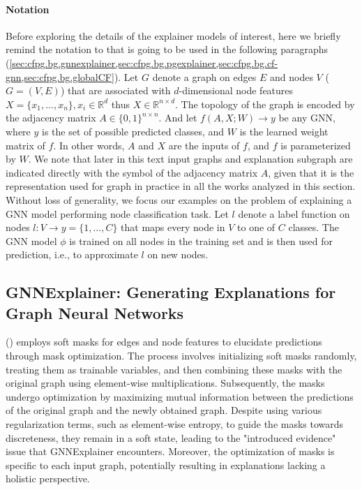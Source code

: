 \documentclass[binding=0.6cm]{sapthesis}
\newcommand{\mycite}[1]{(\cite{#1})}
\begin{document}

\paragraph{Notation}
\label{sec:cfpg.bg.explainers}
Before exploring the details of the explainer models of interest, here we briefly remind the notation to that is going to be used in the following paragraphs (\cref{sec:cfpg.bg.gnnexplainer,sec:cfpg.bg.pgexplainer,sec:cfpg.bg.cf-gnn,sec:cfpg.bg.globalCF}). Let $G$ denote a graph on edges $E$ and nodes $V$ ($G=(V,E)$) that are associated with $d$-dimensional node features $X = \{x_1 , . . . , x_n\}, x_i \in \mathbb{R}^d$ thus $X \in \mathbb{R}^{n\times d}$. The topology of the graph is encoded by the adjacency matrix $A \in \{0,1\}^{n\times n}$. And let $f(A, X; W ) \rightarrow y$ be any GNN, where $y$ is the set of possible predicted classes, and $W$ is the learned weight matrix of $f$. In other words, $A$ and $X$ are the inputs of $f$, and $f$ is parameterized by $W$. We note that later in this text input graphs and explanation subgraph are indicated directly with the symbol of the adjacency matrix $A$, given that it is the representation used for graph in practice in all the works analyzed in this section. Without loss of generality, we focus our examples on the problem of explaining a GNN model performing node classification task. Let $l$ denote a label function on nodes $l : V \rightarrow y=\{1, ..., C\}$ that maps every node in $V$ to one of $C$ classes. The GNN model $\phi$ is trained on all nodes in the training set and is then used for prediction, i.e., to approximate $l$ on new nodes.

\subsection{GNNExplainer: Generating Explanations
for Graph Neural Networks} 
\label{sec:cfpg.bg.gnnexplainer}
\mycite{ying2019-gnnexplainer} employs soft masks for edges and node features to elucidate predictions through mask optimization. The process involves initializing soft masks randomly, treating them as trainable variables, and then combining these masks with the original graph using element-wise multiplications. Subsequently, the masks undergo optimization by maximizing mutual information between the predictions of the original graph and the newly obtained graph. Despite using various regularization terms, such as element-wise entropy, to guide the masks towards discreteness, they remain in a soft state, leading to the "introduced evidence" issue that GNNExplainer encounters. Moreover, the optimization of masks is specific to each input graph, potentially resulting in explanations lacking a holistic perspective.
\end{document}

